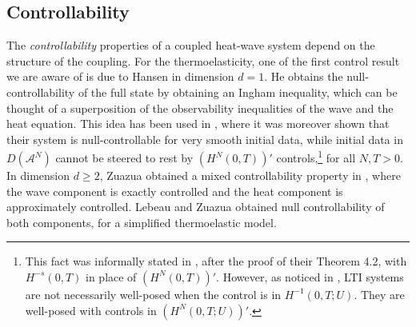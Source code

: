 \documentclass[10pt]{article}
\begin{document}
\subsection{Controllability}
The \textit{controllability} properties of a coupled heat-wave system depend on the structure of the coupling. For the thermoelasticity, one of the first control result we are aware of is due to Hansen \cite{hansen} in dimension $d=1$. He obtains the null-controllability of the full state by obtaining an Ingham inequality, which can be thought of a superposition of the observability inequalities of the wave and the heat equation. This idea has been used in \cite{Zhang_Zuazua}, where it was moreover shown that their system is null-controllable for very smooth initial data, while initial data in $D(\mathcal{A}^N)$ cannot be steered to rest by $(H^N(0,T))'$ controls,\footnote{This fact was informally stated in \cite{Zhang_Zuazua}, after the proof of their Theorem 4.2, with $H^{-s}(0,T)$ in place of $(H^N(0,T))'$. However, as noticed in \cite[\S 4.1.1]{davron_rough}, LTI systems are not necessarily well-posed when the control is in $H^{-1}(0,T;U)$. They are well-posed with controls in $(H^N(0,T;U))'$.} for all $N,T > 0$. In dimension $d \geq 2$, Zuazua obtained a mixed controllability property in \cite{zuazua_control_thermoelastic}, where the wave component is exactly controlled and the heat component is approximately controlled. Lebeau and Zuazua \cite{lebeau_zuazua} obtained null controllability of both components, for a simplified thermoelastic model. 
\end{document}
